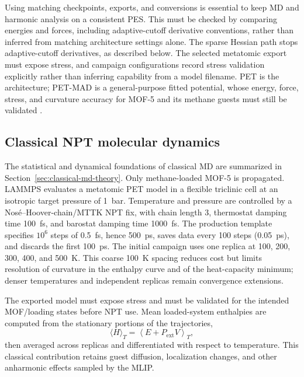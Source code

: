 \documentclass[10pt,a4paper,twocolumn]{article}
\begin{document}
Using matching checkpoints, exports, and conversions is essential to keep
MD and harmonic analysis on a consistent PES. This must be checked by
comparing energies and forces, including adaptive-cutoff derivative
conventions, rather than inferred from matching architecture settings alone.
The sparse Hessian path stops adaptive-cutoff derivatives, as described below.
The selected metatomic export must expose stress, and campaign configurations
record stress validation explicitly rather than inferring capability from a
model filename. PET is the architecture; PET-MAD is a general-purpose fitted
potential, whose energy, force, stress, and curvature accuracy for MOF-5 and
its methane guests must still be validated \cite{petmad}.

\subsection{Classical NPT molecular dynamics}

The statistical and dynamical foundations of classical MD are summarized in
Section~\ref{sec:classical-md-theory}. Only methane-loaded MOF-5 is propagated.
LAMMPS evaluates a metatomic PET model in a flexible triclinic cell at an
isotropic target pressure of \SI{1}{bar}. Temperature and pressure are
controlled by a Nos\'e--Hoover-chain/MTTK NPT fix, with chain length 3,
thermostat damping time \SI{100}{fs}, and barostat damping time
\SI{1000}{fs}. The production template specifies $10^6$ steps of
\SI{0.5}{fs}, hence \SI{500}{ps}, saves data every 100 steps
(\SI{0.05}{ps}), and discards the first \SI{100}{ps}. The initial campaign
uses one replica at 100, 200, 300, 400, and \SI{500}{K}. This coarse
\SI{100}{K} spacing reduces cost but limits resolution of curvature in the
enthalpy curve and of the heat-capacity minimum; denser temperatures and
independent replicas remain convergence extensions.

The exported model must expose stress and must be validated for the intended
MOF/loading states before NPT use. Mean loaded-system enthalpies are computed
from the stationary portions of the trajectories,
\begin{equation}
  \langle H\rangle_T
  =\left\langle E+P_{\mathrm{ext}}V\right\rangle_T,
\end{equation}
then averaged across replicas and differentiated with respect to temperature.
This classical contribution retains guest diffusion, localization changes,
and other anharmonic effects sampled by the MLIP.
\end{document}
